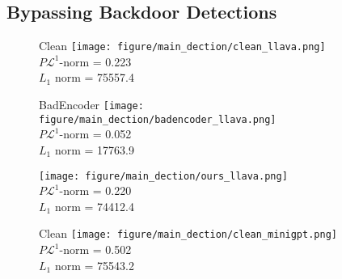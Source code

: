 \subsection{Bypassing Backdoor Detections}
\label{exp:detection}
\begin{figure*}[t]
\vspace{-10pt}
\centering
    \begin{subfigure}[b]{0.15\textwidth}
        \begin{minipage}{0.05\linewidth}
        \end{minipage}
        \begin{minipage}{0.9\linewidth}
            \parbox{\linewidth}{\small Clean \texttt{[image: figure/main\_dection/clean\_llava.png]} \\ \centering \scriptsize$P\mathcal{L}^1$-norm = 0.223 \\ $L_1$ norm = 75557.4}
        \end{minipage}
    \end{subfigure}
    \begin{subfigure}[b]{0.135\textwidth}
        \centering
        \parbox{\linewidth}{\small BadEncoder \texttt{[image: figure/main\_dection/badencoder\_llava.png]} \\ \centering \scriptsize $P\mathcal{L}^1$-norm = 0.052 \\ $L_1$ norm = 17763.9}
    \end{subfigure}
    \begin{subfigure}[b]{0.135\textwidth}
        \centering
        \parbox{\linewidth}{\small \project \texttt{[image: figure/main\_dection/ours\_llava.png]} \\ \centering \scriptsize $P\mathcal{L}^1$-norm = 0.220 \\ $L_1$ norm = 74412.4}
    \end{subfigure}
    \begin{subfigure}[b]{0.15\textwidth}
        \begin{minipage}{0.05\linewidth}
        \end{minipage}
        \begin{minipage}{0.9\linewidth}
            \parbox{\linewidth}{\small Clean \texttt{[image: figure/main\_dection/clean\_minigpt.png]} \\ \centering \scriptsize $P\mathcal{L}^1$-norm = 0.502 \\ $L_1$ norm = 75543.2}

\end{minipage}
\end{subfigure}
\end{figure*}
